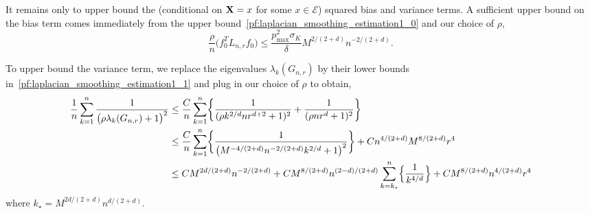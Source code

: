 \documentclass{article}
\newcommand{\1}{\mathbf{1}}
\newcommand{\Lap}{L}
\newcommand{\mc}[1]{\mathcal{#1}}
\theoremstyle{alden}
\theoremstyle{aldenthm}
\theoremstyle{definition}
\theoremstyle{remark}
\begin{document}
It remains only to upper bound the (conditional on ${\bf X} = x$ for some $x \in \mc{E}$) squared bias and variance terms. A sufficient upper bound on the bias term comes immediately from the upper bound~\ref{pf:laplacian_smoothing_estimation1_0} and our choice of $\rho$,
\begin{equation}
\label{pf:laplacian_smoothing_estimation1_2.5}
\frac{\rho}{n} \bigl(f_0^T \Lap_{{n,r}} f_0\bigr) \leq \frac{p_{\max}^2 \sigma_K}{\delta} M^{2/(2+d)} n^{-2/(2 + d)}.
\end{equation}

To upper bound the variance term, we replace the eigenvalues $\lambda_k(G_{n,r})$ by their lower bounds in~\ref{pf:laplacian_smoothing_estimation1_1} and plug in our choice of $\rho$ to obtain,
\begin{align}
\frac{1}{n}\sum_{k = 1}^{n} \frac{1}{\bigl(\rho \lambda_{k}(G_{n,r}) + 1\bigr)^2} & \leq \frac{C}{n}\sum_{k = 1}^{n} \biggl\{\frac{1}{(\rho k^{2/d} n r^{d + 2} + 1)^2} + \frac{1}{(\rho n r^{d} + 1)^2} \biggr\} \nonumber \\
& \leq \frac{C}{n}\sum_{k = 1}^{n} \biggl\{\frac{1}{\bigl(M^{-4/(2 + d)}n^{-2/(2+d)}k^{2/d} + 1\bigr)^2}\biggr\} + Cn^{4/(2 + d)}M^{8/(2+d)}r^{4} \nonumber \\
& \leq CM^{2d/(2 + d)} n^{-2/(2 + d)} + CM^{8/(2 + d)}n^{(2 - d)/(2 + d)} \sum_{k = k_{\star}}^{n} \Bigl\{\frac{1}{k^{4/d}}\Bigr\}  + CM^{8/(2 + d)}n^{4/(2 + d)}r^4 \label{pf:laplacian_smoothing_estimation1_2.25}
\end{align}
where $k_{\star} = M^{2d/(2 + d)}n^{d/(2 + d)}$.  
\end{document}

